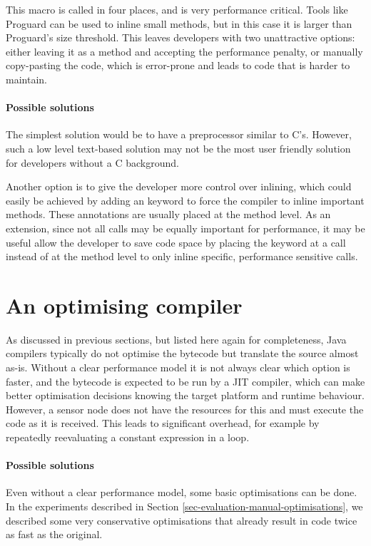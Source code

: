 This macro is called in four places, and is very performance critical. Tools like Proguard \cite{proguard} can be used to inline small methods, but in this case it is larger than Proguard's size threshold. This leaves developers with two unattractive options: either leaving it as a method and accepting the performance penalty, or manually copy-pasting the code, which is error-prone and leads to code that is harder to maintain.

\paragraph{Possible solutions}
The simplest solution would be to have a preprocessor similar to C's. However, such a low level text-based solution may not be the most user friendly solution for developers without a C background.

Another option is to give the developer more control over inlining, which could easily be achieved by adding an  keyword to force the compiler to inline important methods. These annotations are usually placed at the method level. As an extension, since not all calls may be equally important for performance, it may be useful allow the developer to save code space by placing the  keyword at a call instead of at the method level to only inline specific, performance sensitive calls.




\section{An optimising compiler}
\label{sec-optimising-javac}
As discussed in previous sections, but listed here again for completeness, Java compilers typically do not optimise the bytecode but translate the source almost as-is. Without a clear performance model it is not always clear which option is faster, and the bytecode is expected to be run by a JIT compiler, which can make better optimisation decisions knowing the target platform and runtime behaviour. However, a sensor node does not have the resources for this and must execute the code as it is received. This leads to significant overhead, for example by repeatedly reevaluating a constant expression in a loop.

\paragraph{Possible solutions}
Even without a clear performance model, some basic optimisations can be done. In the experiments described in Section \ref{sec-evaluation-manual-optimisations}, we described some very conservative optimisations that already result in code twice as fast as the original.




